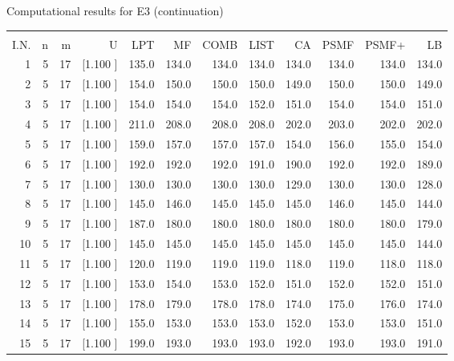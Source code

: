 \documentclass[12pt,a4paper]{article}
\begin{document}
\newpage
\begin{center}
 Computational results for E3 (continuation) {\tiny
\begin{tabular}{r r r r r r r r r r r r}\hline
    &   &   &          &        &        &        &        &        &        &        &       \\[-0.1in]
  I.N.  &  n  &  m  &  U  &  LPT  &  MF  &  COMB  &  LIST  &  CA  & PSMF &PSMF+ & LB \\[0.03in]
\hline
   1&  5& 17&[1.100     ]&   135.0&   134.0&   134.0&   134.0&   134.0&   134.0&   134.0&   134.0\\[-0.02in]
   2&  5& 17&[1.100     ]&   154.0&   150.0&   150.0&   150.0&   149.0&   150.0&   150.0&   149.0\\[-0.02in]
   3&  5& 17&[1.100     ]&   154.0&   154.0&   154.0&   152.0&   151.0&   154.0&   154.0&   151.0\\[-0.02in]
   4&  5& 17&[1.100     ]&   211.0&   208.0&   208.0&   208.0&   202.0&   203.0&   202.0&   202.0\\[-0.02in]
   5&  5& 17&[1.100     ]&   159.0&   157.0&   157.0&   157.0&   154.0&   156.0&   155.0&   154.0\\[-0.02in]
   6&  5& 17&[1.100     ]&   192.0&   192.0&   192.0&   191.0&   190.0&   192.0&   192.0&   189.0\\[-0.02in]
   7&  5& 17&[1.100     ]&   130.0&   130.0&   130.0&   130.0&   129.0&   130.0&   130.0&   128.0\\[-0.02in]
   8&  5& 17&[1.100     ]&   145.0&   146.0&   145.0&   145.0&   145.0&   146.0&   145.0&   144.0\\[-0.02in]
   9&  5& 17&[1.100     ]&   187.0&   180.0&   180.0&   180.0&   180.0&   180.0&   180.0&   179.0\\[-0.02in]
  10&  5& 17&[1.100     ]&   145.0&   145.0&   145.0&   145.0&   145.0&   145.0&   145.0&   144.0\\[-0.02in]
  11&  5& 17&[1.100     ]&   120.0&   119.0&   119.0&   119.0&   118.0&   119.0&   118.0&   118.0\\[-0.02in]
  12&  5& 17&[1.100     ]&   153.0&   154.0&   153.0&   152.0&   151.0&   152.0&   152.0&   151.0\\[-0.02in]
  13&  5& 17&[1.100     ]&   178.0&   179.0&   178.0&   178.0&   174.0&   175.0&   176.0&   174.0\\[-0.02in]
  14&  5& 17&[1.100     ]&   155.0&   153.0&   153.0&   153.0&   152.0&   153.0&   153.0&   151.0\\[-0.02in]
  15&  5& 17&[1.100     ]&   199.0&   193.0&   193.0&   193.0&   192.0&   193.0&   193.0&   191.0\\[-0.02in]

\end{tabular}}
\end{center}
\end{document}
